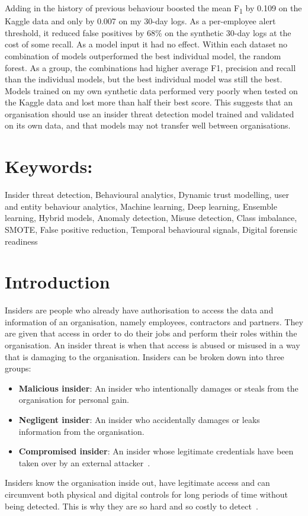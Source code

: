 \documentclass[a4paper,12pt]{article}
\begin{document}
Adding in the history of previous behaviour boosted the mean F\textsubscript{1} by 0.109 on the Kaggle data and only by 0.007 on my 30-day logs. As a per-employee alert threshold, it reduced false positives by 68\% on the synthetic 30-day logs at the cost of some recall. As a model input it had no effect. Within each dataset no combination of models outperformed the best individual model, the random forest. As a group, the combinations had higher average F1, precision and recall than the individual models, but the best individual model was still the best. Models trained on my own synthetic data performed very poorly when tested on the Kaggle data and lost more than half their best score. This suggests that an organisation should use an insider threat detection model trained and validated on its own data, and that models may not transfer well between organisations.

\section*{Keywords:}

Insider threat detection, Behavioural analytics, Dynamic trust modelling, user and entity behaviour analytics, Machine learning, Deep learning, Ensemble learning, Hybrid models, Anomaly detection, Misuse detection, Class imbalance, SMOTE, False positive reduction, Temporal behavioural signals, Digital forensic readiness

\newpage
\tableofcontents
\newpage

\section{Introduction}
\label{sec:1}

Insiders are people who already have authorisation to access the data and information of an organisation, namely employees, contractors and partners. They are given that access in order to do their jobs and perform their roles within the organisation. An insider threat is when that access is abused or misused in a way that is damaging to the organisation. Insiders can be broken down into three groups:

\begin{itemize}
  \item \textbf{Malicious insider}: An insider who intentionally damages or steals from the organisation for personal gain.
  \item \textbf{Negligent insider}: An insider who accidentally damages or leaks information from the organisation.
  \item \textbf{Compromised insider}: An insider whose legitimate credentials have been taken over by an external attacker~\cite{homoliak2019}.
\end{itemize}
Insiders know the organisation inside out, have legitimate access and can circumvent both physical and digital controls for long periods of time without being detected. This is why they are so hard and so costly to detect~\cite{saxena2020}.
\end{document}
